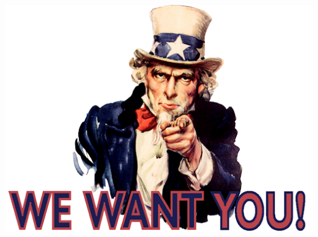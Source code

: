 \documentclass[aspectratio=169]{beamer}
\begin{document}
\begin{frame}
\begin{columns}
    \vspace{-3ex}
    \begin{center}
      \includegraphics[width=0.8\linewidth]{figures/weWantYou.png}\\
    \end{center}
  \end{columns}
\end{frame}
\end{document}
